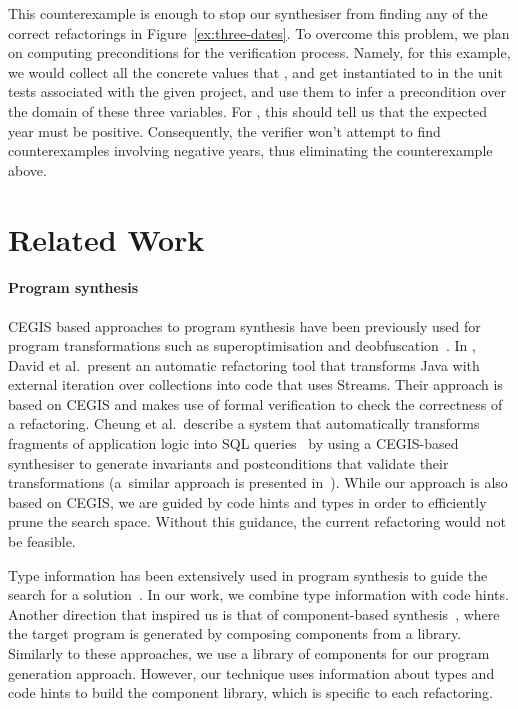 \documentclass[sigconf,review,anonymous]{acmart}
\begin{document}
  This counterexample is enough to stop our synthesiser from finding any of the correct refactorings in Figure~\ref{ex:three-dates}.
  To overcome this problem, we plan on computing preconditions for the verification process. Namely, for this example, we would collect all the concrete values that
  ,  and  get instantiated to in the unit tests associated with the given project, and use them to
  infer a precondition over the domain of these three variables. For , this should tell us that the expected year must be positive.
  Consequently, the verifier won't attempt to find counterexamples involving negative years, thus eliminating the counterexample above.


  
\section{Related Work}

\paragraph{Program synthesis}


CEGIS based approaches to program synthesis have been previously used
for program transformations such as superoptimisation and
deobfuscation~\cite{DBLP:conf/icse/JhaGST10}.  In
\cite{DBLP:journals/corr/abs-1712-07388}, David et al.~present an
automatic refactoring tool that transforms Java with external
iteration over collections into code that uses Streams. Their approach
is based on CEGIS and makes use of formal verification to check the
correctness of a refactoring.  Cheung et al.~describe a system that
automatically transforms fragments of application logic into SQL
queries~\cite{DBLP:conf/pldi/CheungSM13} by using a CEGIS-based
synthesiser to generate invariants and postconditions that validate
their transformations (a~similar approach is presented
in~\cite{DBLP:conf/cc/IuCZ10}).  While our approach is also based
on CEGIS, we are guided by code hints and types in
order to efficiently prune the search space. Without this guidance,
the current refactoring would not be feasible.  

Type information has been extensively used in program synthesis to
guide the search for a solution~\cite{DBLP:conf/sfp/Katayama05,DBLP:conf/pldi/FeserCD15,DBLP:conf/pldi/OseraZ15,DBLP:journals/pacmpl/LubinCOC20}.
In our work, we combine type information with code hints.
%
Another direction that inspired us is that of component-based synthesis~\cite{DBLP:conf/icse/JhaGST10,DBLP:conf/pldi/GulwaniJTV11,DBLP:conf/popl/FengM0DR17}, where the target program is generated by composing components from a library. Similarly
to these approaches, we use a library of components for our program
generation approach. However, our technique uses information about types
and code hints to build the component library, which is specific to each refactoring.
\end{document}
